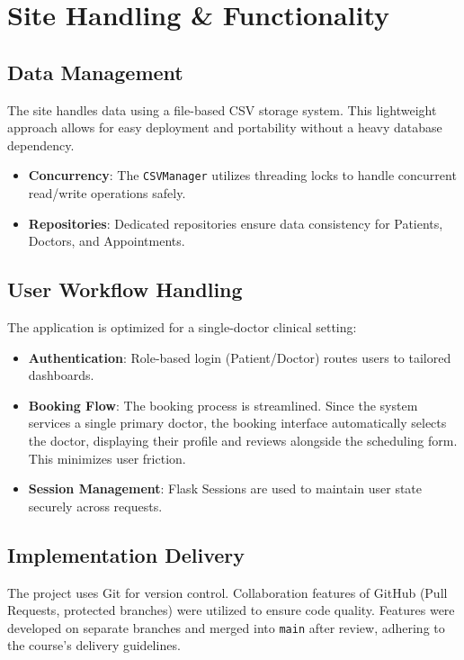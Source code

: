 \documentclass[12pt,a4paper]{article}
\begin{document}
\section{Site Handling & Functionality}

\subsection{Data Management}
The site handles data using a file-based CSV storage system. This lightweight approach allows for easy deployment and portability without a heavy database dependency.
\begin{itemize}
    \item \textbf{Concurrency}: The \texttt{CSVManager} utilizes threading locks to handle concurrent read/write operations safely.
    \item \textbf{Repositories}: Dedicated repositories ensure data consistency for Patients, Doctors, and Appointments.
\end{itemize}

\subsection{User Workflow Handling}
The application is optimized for a single-doctor clinical setting:
\begin{itemize}
    \item \textbf{Authentication}: Role-based login (Patient/Doctor) routes users to tailored dashboards.
    \item \textbf{Booking Flow}: The booking process is streamlined. Since the system services a single primary doctor, the booking interface automatically selects the doctor, displaying their profile and reviews alongside the scheduling form. This minimizes user friction.
    \item \textbf{Session Management}: Flask Sessions are used to maintain user state securely across requests.
\end{itemize}

\subsection{Implementation Delivery}
The project uses Git for version control. Collaboration features of GitHub (Pull Requests, protected branches) were utilized to ensure code quality. Features were developed on separate branches and merged into \texttt{main} after review, adhering to the course's delivery guidelines.
\end{document}
